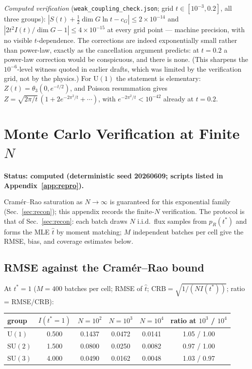 \documentclass[11pt]{article}
\theoremstyle{remark}
\theoremstyle{plain}
\newcommand{\dG}{\dim G}
\begin{document}
\emph{Computed verification} (\texttt{weak\_coupling\_check.json}; grid $t \in [10^{-3}, 0.2]$, all three groups): $|S(t) + \tfrac12\dG\ln t - c_G| \leq 2\times10^{-14}$ and $|2t^2 I(t)/\dG - 1| \leq 4\times10^{-15}$ at every grid point --- machine precision, with no visible $t$-dependence. The corrections are indeed exponentially small rather than power-law, exactly as the cancellation argument predicts: at $t = 0.2$ a power-law correction would be conspicuous, and there is none. (This sharpens the $10^{-6}$-level witness quoted in earlier drafts, which was limited by the verification grid, not by the physics.) For $\mathrm{U}(1)$ the statement is elementary: $Z(t) = \theta_3(0, e^{-t/2})$, and Poisson resummation gives $Z = \sqrt{2\pi/t}\,(1 + 2e^{-2\pi^2/t} + \cdots)$, with $e^{-2\pi^2/t} < 10^{-42}$ already at $t = 0.2$.

\section{Monte Carlo Verification at Finite \texorpdfstring{$N$}{N}}\label{app:mc}

\textbf{Status: computed (deterministic seed 20260609; scripts listed in Appendix~\ref{app:repro}).}

Cram\'er--Rao saturation as $N \to \infty$ is guaranteed for this exponential family (Sec.~\ref{sec:recon}); this appendix records the finite-$N$ verification. The protocol is that of Sec.~\ref{sec:recon}: each batch draws $N$ i.i.d.\ flux samples from $p_R(t^*)$ and forms the MLE $\hat t$ by moment matching; $M$ independent batches per cell give the RMSE, bias, and coverage estimates below.

\subsection{RMSE against the Cram\'er--Rao bound}\label{sec:results}

At $t^* = 1$ ($M = 400$ batches per cell; RMSE of $\hat t$; $\mathrm{CRB} = \sqrt{1/(N I(t^*))}$; ratio = RMSE/CRB):

\begin{center}
\begin{tabular}{lccccc}
\toprule
group & $I(t^*{=}1)$ & $N = 10^2$ & $N = 10^3$ & $N = 10^4$ & ratio at $10^3$ / $10^4$ \\
\midrule
$\mathrm{U}(1)$ & 0.500 & 0.1437 & 0.0472 & 0.0141 & 1.05 / 1.00 \\
$\mathrm{SU}(2)$ & 1.500 & 0.0800 & 0.0250 & 0.0082 & 0.97 / 1.00 \\
$\mathrm{SU}(3)$ & 4.000 & 0.0490 & 0.0162 & 0.0048 & 1.03 / 0.97 \\
\bottomrule
\end{tabular}
\end{center}
\end{document}
